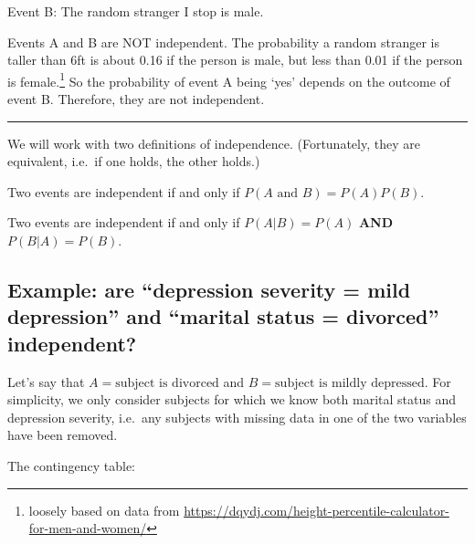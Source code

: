 \documentclass[]{book}
\let\rmarkdownfootnote\footnote%
\def\footnote{\protect\rmarkdownfootnote}
\theoremstyle{definition}
\theoremstyle{definition}
\theoremstyle{definition}
\theoremstyle{remark}
\let\BeginKnitrBlock\begin \let\EndKnitrBlock\end
\begin{document}
Event B: The random stranger I stop is male.

Events A and B are NOT independent. The probability a random stranger is taller than 6ft is about 0.16 if the person is male, but less than 0.01 if the person is female.\footnote{loosely based on data from \url{https://dqydj.com/height-percentile-calculator-for-men-and-women/}} So the probability of event A being `yes' depends on the outcome of event B. Therefore, they are not independent.

\begin{center}\rule{0.5\linewidth}{\linethickness}\end{center}

We will work with two definitions of independence. (Fortunately, they are equivalent, i.e.~if one holds, the other holds.)

\BeginKnitrBlock{definition}
\protect\hypertarget{def:ind1}{}{\label{def:ind1} }Two events are independent if and only if \(P(A \text{ and } B) = P(A) P(B)\).
\EndKnitrBlock{definition}

\BeginKnitrBlock{definition}
\protect\hypertarget{def:ind2}{}{\label{def:ind2} }Two events are independent if and only if \(P(A | B) = P(A)\) \textbf{AND} \(P(B | A) = P(B)\).
\EndKnitrBlock{definition}

\hypertarget{example-are-depression-severity-mild-depression-and-marital-status-divorced-independent}{%
\subsection{Example: are ``depression severity = mild depression'' and ``marital status = divorced'' independent?}\label{example-are-depression-severity-mild-depression-and-marital-status-divorced-independent}}

Let's say that \(A = \text{subject is divorced}\) and \(B = \text{subject is mildly depressed}\). For simplicity, we only consider subjects for which we know both marital status and depression severity, i.e.~any subjects with missing data in one of the two variables have been removed.

The contingency table:
\end{document}
